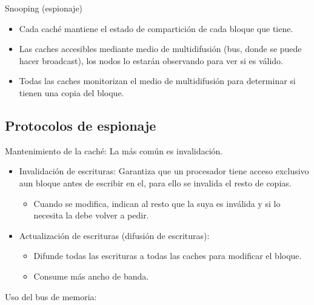 \documentclass[12pt, twoside, openright]{report} %
\begin{document}
      Snooping (espionaje)

      \begin{itemize}
      
      \item
        Cada caché mantiene el estado de compartición de cada bloque
        que tiene.
      \item
        Las caches accesibles mediante medio de multidifusión (bus,
        donde se puede hacer broadcast), los nodos lo estarán
        observando para ver si es válido.
      \item
        Todas las caches monitorizan el medio de multidifusión para
        determinar si tienen una copia del bloque.
      \end{itemize}


      \subsection{Protocolos de espionaje}



    Mantenimiento de la caché: La más común es invalidación.

    \begin{itemize}
    
    \item
      Invalidación de escrituras: Garantiza que un procesador tiene
      acceso exclusivo aun bloque antes de escribir en el, para ello
      se invalida el resto de copias.

      \begin{itemize}
      
      \item
        Cuando se modifica, indican al resto que la suya es inválida y
        si lo necesita la debe volver a pedir.
      \end{itemize}
    \item
      Actualización de escrituras (difusión de escrituras):

      \begin{itemize}
      
      \item
        Difunde todas las escrituras a todas las caches para modificar
        el bloque.
      \item
        Consume más ancho de banda.
      \end{itemize}
    \end{itemize}

    Uso del bus de memoria:
\end{document}
